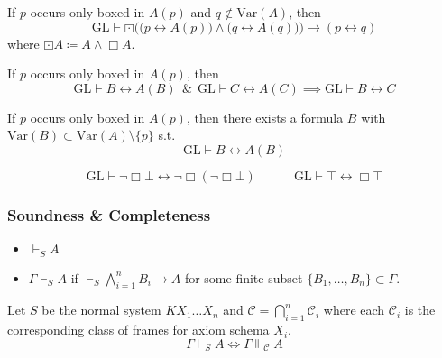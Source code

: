 \documentclass[UTF8,11pt,colorlinks,compress,openany]{beamer}%
\begin{document}
\begin{frame}\frametitle{\hyperlink{fixpoint-uniqueness}{}}
\label{provability-logic}
\setlength\abovedisplayskip{0pt}
\setlength\belowdisplayskip{0pt}\vspace{-1ex}
	\begin{theorem}
		If $p$ occurs only boxed in $A(p)$ and $q\notin \mathrm{Var}(A)$, then
		\[\mathrm{GL}\vdash\boxdot\Big(\big(p\leftrightarrow A(p)\big)\wedge\big(q\leftrightarrow A(q)\big)\Big)\to(p\leftrightarrow q)\]
		where $\boxdot A\coloneqq A\wedge\Box A$.
	\end{theorem}\vspace{-1ex}
	\begin{corollary}
		If $p$ occurs only boxed in $A(p)$, then \[\mathrm{GL}\vdash B\leftrightarrow A(B)\;\,\&\;\,\mathrm{GL}\vdash C\leftrightarrow A(C)\implies\mathrm{GL}\vdash B\leftrightarrow C\]
	\end{corollary}\vspace{-1ex}
	\begin{theorem}
		If $p$ occurs only boxed in $A(p)$, then there exists a formula $B$ with $\mathrm{Var}(B)\subset \mathrm{Var}(A)\setminus\{p\}$ s.t.
		\[\mathrm{GL}\vdash B\leftrightarrow A(B)\]	
	\end{theorem}
	\begin{center}
	\end{center}
	\[\mathrm{GL}\vdash\neg\Box\bot\leftrightarrow\neg\Box(\neg\Box\bot)\qquad\quad\mathrm{GL}\vdash\top\leftrightarrow\Box\top\]
\end{frame}

\begin{frame}\frametitle{Soundness \& Completeness}
	\begin{definition}
		\begin{itemize}
			\item $\vdash_S A$
			\item $\Gamma\vdash_S A$ if $\vdash_S\bigwedge\limits_{i=1}^n B_i\to A$ for some finite subset $\{B_1,\dots, B_n\}\subset\Gamma$.
		\end{itemize}
	\end{definition}
	\begin{theorem}
		Let $S$ be the normal system $KX_1\dots X_n$ and $\mathcal{C}=\bigcap\limits_{i=1}^n\mathcal{C}_i$ where each $\mathcal{C}_i$ is the corresponding class of frames for axiom schema $X_i$.
		\[\Gamma\vdash_S A\iff\Gamma\Vdash_{\mathcal{C}} A\]
	\end{theorem}
\end{frame}
\end{document}

